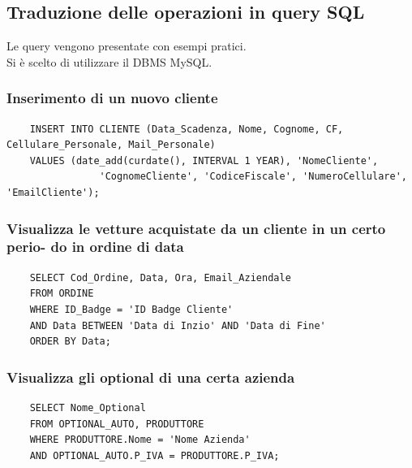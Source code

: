 \documentclass[12pt]{article}
\begin{document}
\subsection{Traduzione delle operazioni in query SQL}

Le query vengono presentate con esempi pratici.\\
Si è scelto di utilizzare il DBMS MySQL.

\lstset{style=sqlStyle}

\subsubsection*{Inserimento di un nuovo cliente}

\begin{lstlisting}
    INSERT INTO CLIENTE (Data_Scadenza, Nome, Cognome, CF, Cellulare_Personale, Mail_Personale)
    VALUES (date_add(curdate(), INTERVAL 1 YEAR), 'NomeCliente', 
                'CognomeCliente', 'CodiceFiscale', 'NumeroCellulare', 'EmailCliente');
\end{lstlisting}

\subsubsection*{Visualizza le vetture acquistate da un cliente in un certo perio-
do in ordine di data}

\begin{lstlisting}
    SELECT Cod_Ordine, Data, Ora, Email_Aziendale 
    FROM ORDINE
    WHERE ID_Badge = 'ID Badge Cliente' 
    AND Data BETWEEN 'Data di Inzio' AND 'Data di Fine'
    ORDER BY Data;
\end{lstlisting}

\subsubsection*{Visualizza gli optional di una certa azienda}
\begin{lstlisting}
    SELECT Nome_Optional
    FROM OPTIONAL_AUTO, PRODUTTORE
    WHERE PRODUTTORE.Nome = 'Nome Azienda'
    AND OPTIONAL_AUTO.P_IVA = PRODUTTORE.P_IVA;
\end{lstlisting}
\end{document}
